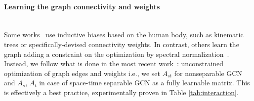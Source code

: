 \documentclass[10pt,twocolumn,letterpaper]{article}
\begin{document}
\paragraph{Learning the graph connectivity and weights} \greencheck \\
Some works~\cite{Dang21, yan18} use inductive biases based on the human body, such as kinematic trees or specifically-devised connectivity weights. In contrast, others learn the graph adding a constraint on the optimization by spectral normalization~\cite{kipf2018neural}.
Instead, we follow what is done in the most recent work~\cite{sofianos21}: unconstrained optimization of graph edges and weights i.e., we set $A_{st}$ for nonseparable GCN and $A_s$, $A_t$ in case of space-time separable GCN as a fully learnable matrix. 
This is effectively a best practice, experimentally proven in Table \ref{tab:interaction}.
\end{document}
